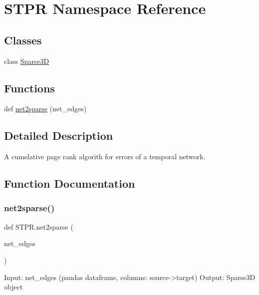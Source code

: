 \hypertarget{namespaceSTPR}{}\section{S\+T\+PR Namespace Reference}
\label{namespaceSTPR}
\subsection*{Classes}
\begin{DoxyCompactItemize}
\item 
class \mbox{\hyperlink{classSTPR_1_1Sparse3D}{Sparse3D}}
\end{DoxyCompactItemize}
\subsection*{Functions}
\begin{DoxyCompactItemize}
\item 
def \mbox{\hyperlink{namespaceSTPR_a072ffc21155b6212d382a7b1aaac73a7}{net2sparse}} (net\+\_\+edges)
\end{DoxyCompactItemize}


\subsection{Detailed Description}
\begin{DoxyVerb}A cumelative page rank algorith for errors of a temporal network.
\end{DoxyVerb}
 

\subsection{Function Documentation}
\mbox{\label{namespaceSTPR_a072ffc21155b6212d382a7b1aaac73a7}} 
\subsubsection{\texorpdfstring{net2sparse()}{net2sparse()}}
{\footnotesize\ttfamily def S\+T\+P\+R.\+net2sparse (\begin{DoxyParamCaption}\item[{}]{net\+\_\+edges }\end{DoxyParamCaption})}

\begin{DoxyVerb}Input:
    net_edges (pandas dataframe, columns: source->target)
Output:
    Sparse3D object
\end{DoxyVerb}
 
